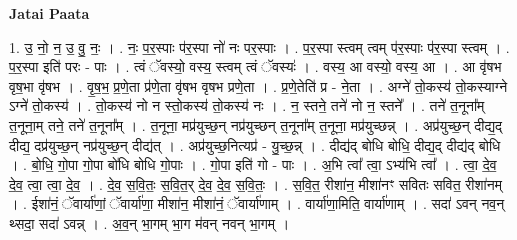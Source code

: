 \documentclass[17pt]{extarticle}
\begin{document}
\textbf{Jatai Paata} \newline

1. उ॒ नो॒ न॒ उ॒ वु॒ नः॒ । . नः॒ प॒र॒स्पाः प॑र॒स्पा नो॑ नः पर॒स्पाः । . प॒र॒स्पा स्त्वम् त्वम् प॑र॒स्पाः प॑र॒स्पा स्त्वम् । . प॒र॒स्पा इति॑ परः - पाः । . त्वं ॅवस्यो॒ वस्य॒ स्त्वम् त्वं ॅवस्यः॑ । . वस्य॒ आ वस्यो॒ वस्य॒ आ । . आ वृ॑षभ वृष॒भा वृ॑षभ । . वृ॒ष॒भ॒ प्र॒णे॒ता प्र॑णे॒ता वृ॑षभ वृषभ प्रणे॒ता । . प्र॒णे॒तेति॑ प्र - ने॒ता । . अग्ने॑ तो॒कस्य॑ तो॒कस्याग्ने ऽग्ने॑ तो॒कस्य॑ । . तो॒कस्य॑ नो न स्तो॒कस्य॑ तो॒कस्य॑ नः । . न॒ स्तने॒ तने॑ नो न॒ स्तने᳚ । . तने॑ त॒नूना᳚म् त॒नूना॒म् तने॒ तने॑ त॒नूना᳚म् । . त॒नूना॒ मप्र॑युच्छ॒न् नप्र॑युच्छन् त॒नूना᳚म् त॒नूना॒ मप्र॑युच्छन्न् । . अप्र॑युच्छ॒न् दीद्य॒द् दीद्य॒ दप्र॑युच्छ॒न् नप्र॑युच्छ॒न् दीद्य॑त् । . अप्र॑युच्छ॒नित्यप्र॑ - यु॒च्छ॒न्न् । . दीद्य॑द् बोधि बोधि॒ दीद्य॒द् दीद्य॑द् बोधि । . बो॒धि॒ गो॒पा गो॒पा बो॑धि बोधि गो॒पाः । . गो॒पा इति॑ गो - पाः । . अ॒भि त्वा᳚ त्वा॒ ऽभ्य॑भि त्वा᳚ । . त्वा॒ दे॒व॒ दे॒व॒ त्वा॒ त्वा॒ दे॒व॒ । . दे॒व॒ स॒वि॒तः॒ स॒वि॒त॒र् दे॒व॒ दे॒व॒ स॒वि॒तः॒ । . स॒वि॒त॒ रीशा॑न॒ मीशा॑नꣳ सवितः सवित॒ रीशा॑नम् । . ईशा॑नं॒ ॅवार्या॑णां॒ ॅवार्या॑णा॒ मीशा॑न॒ मीशा॑नं॒ ॅवार्या॑णाम् । . वार्या॑णा॒मिति॒ वार्या॑णाम् । . सदा॑ ऽवन् नव॒न् थ्सदा॒ सदा॑ ऽवन्न् । . अ॒व॒न् भा॒गम् भा॒ग म॑वन् नवन् भा॒गम् । \newline
\end{document}
